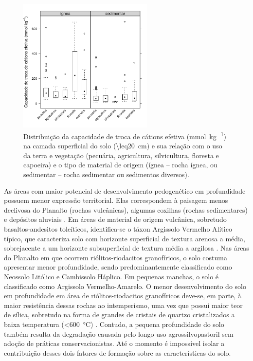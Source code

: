 \begin{figure}[!ht]
\centering
\includegraphics[width=0.60\textwidth]{fig/chap03-ecec-land-parent}
\caption[Capacidade de troca de cátions efetiva no solo e sua relação com o uso da terra e o material de 
origem do solo.]{Distribuição da capacidade de troca de cátions efetiva (\si{\milli\mole\per\kilo\gram}) na 
camada superficial do solo (\SI{\leq20}{\cm}) e sua relação 
com o uso da terra e vegetação (pecuária, agricultura, silvicultura, floresta e capoeira) e o tipo de material 
de origem (ígnea -- rocha ígnea, ou sedimentar -- rocha sedimentar ou sedimentos diversos).}
\label{fig:chap03-ecec-land-parent}
\end{figure}

As áreas com maior potencial de desenvolvimento pedogenético em profundidade possuem menor expressão 
territorial. Elas correspondem à paisagem menos declivosa do Planalto (rochas vulcânicas), algumas coxilhas 
(rochas sedimentares) e depósitos aluviais \cite{Miguel2010}. Em áreas de material de origem vulcânica, 
sobretudo basaltos-andesitos toleíticos, identifica-se o táxon Argissolo Vermelho Alítico típico, que 
caracteriza solo com horizonte superficial de textura arenosa a média, sobrejacente a um horizonte 
subsuperficial de textura média a argilosa \cite{Miguel2010}. Nas áreas do Planalto em que ocorrem 
riólitos-riodacitos granofíricos, o solo costuma apresentar menor profundidade, sendo predominantemente 
classificado como Neossolo Litólico e Cambissolo Háplico. Em pequenas manchas, o solo é classificado como 
Argissolo Vermelho-Amarelo. O menor desenvolvimento do solo em profundidade em área de riólitos-riodacitos 
granofíricos deve-se, em parte, à maior resistência dessas rochas ao intemperismo, uma vez que possui maior 
teor de sílica, sobretudo na forma de grandes de cristais de quartzo cristalizados a baixa temperatura 
(\SI{<600}{\celsius}) \cite{Pedron2007}. Contudo, a pequena profundidade do solo também resulta da degradação 
causada pelo longo uso agrossilvopastoril sem adoção de práticas conservacionistas. Até o momento é impossível 
isolar a contribuição desses dois fatores de formação sobre as características do solo.


